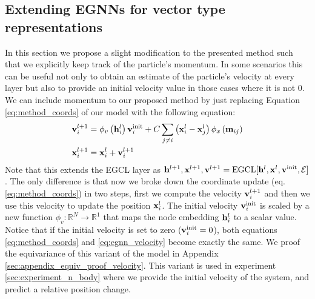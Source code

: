 \subsection{Extending EGNNs for vector type representations} \label{sec:method_velocity}
In this section we propose a slight modification to the presented method such that we explicitly keep track of the particle's momentum. In some scenarios this can be useful not only to obtain an estimate of the particle's velocity at every layer but also to provide an initial velocity value in those cases where it is not 0. We can include momentum to our proposed method by just replacing Equation \ref{eq:method_coords} of our model with the following equation:
\begin{equation} \label{eq:egnn_velocity}
    \begin{aligned}
    \mathbf{v}_{i}^{l+1}&= \phi_{v}\left(\mathbf{h}_{i}^l\right)\mathbf{v}_{i}^\text{init} + C\sum_{j \neq i}\left(\mathbf{x}_{i}^{l}-\mathbf{x}_{j}^{l}\right) \phi_{x}\left(\mathbf{m}_{ij}\right) \\
 \mathbf{x}_{i}^{l+1} &=\mathbf{x}_{i}^{l}+ \mathbf{v}_i^{l+1}
    \end{aligned}
\end{equation}
Note that this extends the EGCL layer as $\mathbf{h}^{l+1}, \mathbf{x}^{l+1}, \mathbf{v}^{l+1} = \text{EGCL}[\mathbf{h}^{l}, \mathbf{x}^{l}, \mathbf{v}^{\text{init}}, \mathcal{E}]$. The only difference is that now we broke down the coordinate update (eq. \ref{eq:method_coords}) in two steps, first we compute the velocity $\mathbf{v}^{l+1}_i$ and then we use this velocity to update the position $\mathbf{x}^l_i$. The initial velocity $\mathbf{v}^{\text{init}}_i$ is scaled by a new function $\phi_v: \mathbb{R}^N \rightarrow \mathbb{R}^1$ that maps the node embedding $\mathbf{h}_i^l$ to a scalar value. Notice that if the initial velocity is set to zero (${\mathbf{v}}^{\text{init}}_i = 0$), both equations \ref{eq:method_coords} and \ref{eq:egnn_velocity} become exactly the same. We proof the equivariance of this variant of the model in Appendix \ref{sec:appendix_equiv_proof_velocity}. This variant is used in experiment \ref{sec:experiment_n_body} where we provide the initial velocity of the system, and predict a relative position change.


